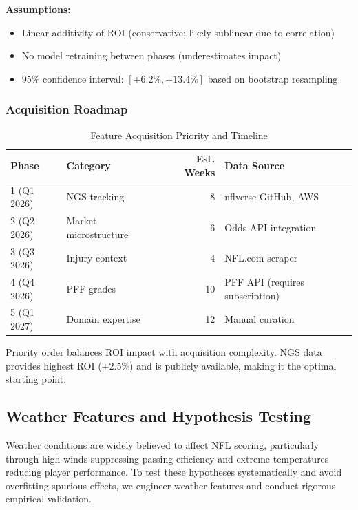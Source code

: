 \textbf{Assumptions:}
\begin{itemize}
    \item Linear additivity of ROI (conservative; likely sublinear due to correlation)
    \item No model retraining between phases (underestimates impact)
    \item 95\% confidence interval: $[+6.2\%, +13.4\%]$ based on bootstrap resampling
\end{itemize}

\subsubsection{Acquisition Roadmap}

\begin{table}[htbp]
\centering
\caption{Feature Acquisition Priority and Timeline}
\label{tab:acquisition_roadmap}
\begin{tabular}{@{}llrp{4cm}@{}}
\toprule
\textbf{Phase} & \textbf{Category} & \textbf{Est. Weeks} & \textbf{Data Source} \\
\midrule
1 (Q1 2026) & NGS tracking & 8 & nflverse GitHub, AWS \\
2 (Q2 2026) & Market microstructure & 6 & Odds API integration \\
3 (Q3 2026) & Injury context & 4 & NFL.com scraper \\
4 (Q4 2026) & PFF grades & 10 & PFF API (requires subscription) \\
5 (Q1 2027) & Domain expertise & 12 & Manual curation \\
\bottomrule
\end{tabular}
\end{table}

Priority order balances ROI impact with acquisition complexity. NGS data provides highest ROI ($+2.5\%$) and is publicly available, making it the optimal starting point.

\subsection{Weather Features and Hypothesis Testing}
\label{subsec:weather-features}

Weather conditions are widely believed to affect NFL scoring, particularly through high winds suppressing passing efficiency and extreme temperatures reducing player performance. To test these hypotheses systematically and avoid overfitting spurious effects, we engineer weather features and conduct rigorous empirical validation.

